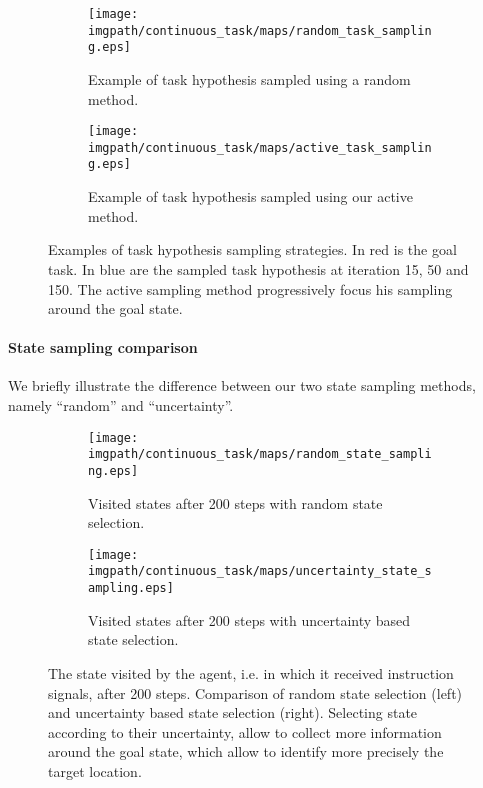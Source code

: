 \begin{figure}[!ht]
\centering
    \begin{subfigure}[b]{\columnwidth}
        \centering
        \texttt{[image: \\imgpath/continuous\_task/maps/random\_task\_sampling.eps]}
        \caption{Example of task hypothesis sampled using a random method.}
        \label{fig:continuoustaskrandomtask}
    \end{subfigure}
    \begin{subfigure}[b]{\columnwidth}
        \centering
        \texttt{[image: \\imgpath/continuous\_task/maps/active\_task\_sampling.eps]}
        \caption{Example of task hypothesis sampled using our active method.}
        \label{fig:continuoustaskactivetask}
    \end{subfigure}
\caption{Examples of task hypothesis sampling strategies. In red is the goal task. In blue are the sampled task hypothesis at iteration 15, 50 and 150. The active sampling method progressively focus his sampling around the goal state.}
\label{fig:continuoustasktasksampling}
\end{figure}

\paragraph{State sampling comparison}

We briefly illustrate the difference between our two state sampling methods, namely ``random'' and ``uncertainty''.


\begin{figure}[!ht]
\centering
    \begin{subfigure}[t]{0.49\columnwidth}
        \centering
        \texttt{[image: \\imgpath/continuous\_task/maps/random\_state\_sampling.eps]}
        \caption{Visited states after 200 steps with random state selection.}
        \label{fig:continuoustaskrandomstates}
    \end{subfigure}
    \begin{subfigure}[t]{0.49\columnwidth}
        \centering
        \texttt{[image: \\imgpath/continuous\_task/maps/uncertainty\_state\_sampling.eps]}
        \caption{Visited states after 200 steps with uncertainty based state selection.}
        \label{fig:continuoustaskactivestates}
    \end{subfigure}
\caption{The state visited by the agent, i.e. in which it received instruction signals, after 200 steps. Comparison of random state selection (left) and uncertainty based state selection (right). Selecting state according to their uncertainty, allow to collect more information around the goal state, which allow to identify more precisely the target location.}
\label{fig:continuoustasktasksampling}
\end{figure}


